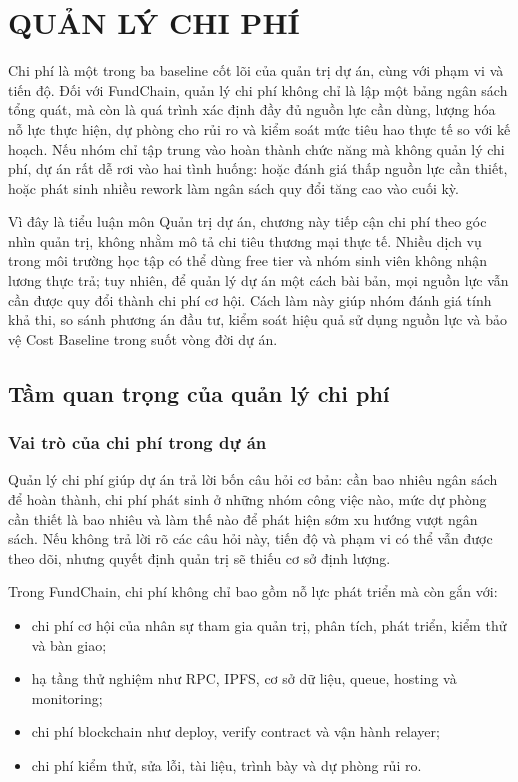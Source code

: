 \chapter{QUẢN LÝ CHI PHÍ}

Chi phí là một trong ba baseline cốt lõi của quản trị dự án, cùng với phạm vi và tiến độ. Đối với FundChain, quản lý chi phí không chỉ là lập một bảng ngân sách tổng quát, mà còn là quá trình xác định đầy đủ nguồn lực cần dùng, lượng hóa nỗ lực thực hiện, dự phòng cho rủi ro và kiểm soát mức tiêu hao thực tế so với kế hoạch. Nếu nhóm chỉ tập trung vào hoàn thành chức năng mà không quản lý chi phí, dự án rất dễ rơi vào hai tình huống: hoặc đánh giá thấp nguồn lực cần thiết, hoặc phát sinh nhiều rework làm ngân sách quy đổi tăng cao vào cuối kỳ.

Vì đây là tiểu luận môn Quản trị dự án, chương này tiếp cận chi phí theo góc nhìn quản trị, không nhằm mô tả chi tiêu thương mại thực tế. Nhiều dịch vụ trong môi trường học tập có thể dùng free tier và nhóm sinh viên không nhận lương thực trả; tuy nhiên, để quản lý dự án một cách bài bản, mọi nguồn lực vẫn cần được quy đổi thành chi phí cơ hội. Cách làm này giúp nhóm đánh giá tính khả thi, so sánh phương án đầu tư, kiểm soát hiệu quả sử dụng nguồn lực và bảo vệ Cost Baseline trong suốt vòng đời dự án.

\iffalse
\section{Tầm quan trọng của quản lý chi phí}

\subsection{Vai trò của chi phí trong dự án}

Quản lý chi phí giúp dự án trả lời bốn câu hỏi cơ bản: cần bao nhiêu ngân sách để hoàn thành, chi phí phát sinh ở những nhóm công việc nào, mức dự phòng cần thiết là bao nhiêu và làm thế nào để phát hiện sớm xu hướng vượt ngân sách. Nếu không trả lời rõ các câu hỏi này, tiến độ và phạm vi có thể vẫn được theo dõi, nhưng quyết định quản trị sẽ thiếu cơ sở định lượng.

Trong FundChain, chi phí không chỉ bao gồm nỗ lực phát triển mà còn gắn với:

\begin{itemize}
  \item chi phí cơ hội của nhân sự tham gia quản trị, phân tích, phát triển, kiểm thử và bàn giao;
  \item hạ tầng thử nghiệm như RPC, IPFS, cơ sở dữ liệu, queue, hosting và monitoring;
  \item chi phí blockchain như deploy, verify contract và vận hành relayer;
  \item chi phí kiểm thử, sửa lỗi, tài liệu, trình bày và dự phòng rủi ro.
\end{itemize}

